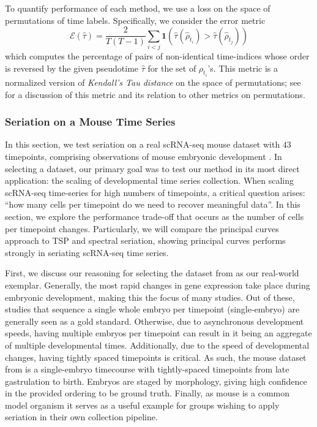 \documentclass[aos, preprint]{imsart}
\theoremstyle{plain}
\theoremstyle{remark}
\begin{document}
{To quantify performance of each method, we use a loss on the space of permutations of time labels. Specifically, we consider the error metric
$$\mathcal{E}(\hat{\tau}) = \frac{2}{T(T-1)} \sum_{i<j}\mathbf{1}(\hat{\tau}(\hat\rho_{t_i})>\hat{\tau}(\hat{\rho}_{t_j}))$$
which computes the percentage of pairs of non-identical time-indices whose order is reversed by the given pseudotime $\hat{\tau}$ for the set of $\rho_{t_i}$'s. This metric is a normalized version of \emph{Kendall's Tau distance} on the space of permutations; see \cite{diaconis1977spearman} for a discussion of this metric and its relation to other metrics on permutations.

\subsubsection*{Seriation on a Mouse Time Series}
In this section, we test seriation on a real scRNA-seq mouse dataset
with $43$ timepoints, comprising observations of mouse embryonic
development \cite{mouse_time_series}. In selecting a dataset, our
primary goal was to test our method in its most direct application:
the scaling of developmental time series collection. When scaling
scRNA-seq time-series for high numbers of timepoints, a critical
question arises: ``how many cells per timepoint do we need to recover
meaningful data''.
In this section, we explore the performance trade-off that occurs as the number of cells per timepoint changes. Particularly, we will compare the principal curves approach to TSP and spectral seriation, showing principal curves performs strongly in seriating scRNA-seq time series.

First, we discuss our reasoning for selecting the dataset from \cite{mouse_time_series} as our real-world exemplar. Generally, the most rapid changes in gene expression take place during embryonic development, making this the focus of many studies. Out of these, studies that sequence a single whole embryo per timepoint (single-embryo) are generally seen as a gold standard. Otherwise, due to asynchronous development speeds, having multiple embryos per timepoint can result in it being an aggregate of multiple developmental times. Additionally, due to the speed of developmental changes, having tightly spaced timepoints is critical. As such, the mouse dataset from  \cite{mouse_time_series} is a single-embryo timecourse with tightly-spaced timepoints from late gastrulation to birth. Embryos are staged by morphology, giving high confidence in the provided ordering to be ground truth. Finally, as mouse is a common model organism it serves as a useful example for groups wishing to apply seriation in their own collection pipeline.

}
\end{document}
